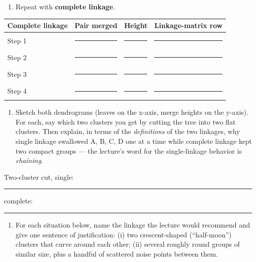 \documentclass[
  11pt,
]{article}
\newcounter{none} %
\providecommand{\tightlist}{%
  \setlength{\itemsep}{0pt}\setlength{\parskip}{0pt}}
\newcommand{\answerspace}[1]{\par\vspace*{#1}}  %
\newcommand{\blank}[1][1.2in]{\rule{#1}{0.4pt}}
\begin{document}
\answerspace{4in}

\begin{enumerate}
\def\labelenumi{(\alph{enumi})}
\setcounter{enumi}{1}
\tightlist
\item
  Repeat with \textbf{complete linkage}.
\end{enumerate}

{\def\LTcaptype{none} %
\begin{longtable}[]{@{}llll@{}}
\toprule\noalign{}
Complete linkage & Pair merged & Height & Linkage-matrix row \\
\midrule\noalign{}
\endhead
\bottomrule\noalign{}
\endlastfoot
Step 1 & \blank[1.2in] & \blank[0.7in] & \blank[2in] \\
Step 2 & \blank[1.2in] & \blank[0.7in] & \blank[2in] \\
Step 3 & \blank[1.2in] & \blank[0.7in] & \blank[2in] \\
Step 4 & \blank[1.2in] & \blank[0.7in] & \blank[2in] \\
\end{longtable}
}

\answerspace{3.2in}

\begin{enumerate}
\def\labelenumi{(\alph{enumi})}
\setcounter{enumi}{2}
\tightlist
\item
  Sketch both dendrograms (leaves on the x-axis, merge heights on the
  y-axis). For each, say which two clusters you get by cutting the tree
  into two flat clusters. Then explain, in terms of the
  \emph{definitions} of the two linkages, why single linkage swallowed
  A, B, C, D one at a time while complete linkage kept two compact
  groups --- the lecture's word for the single-linkage behavior is
  \emph{chaining}.
\end{enumerate}

\answerspace{3.4in}

Two-cluster cut, single: \blank[2in] \qquad complete: \blank[2in]

\answerspace{1.4in}

\begin{enumerate}
\def\labelenumi{(\alph{enumi})}
\setcounter{enumi}{3}
\tightlist
\item
  For each situation below, name the linkage the lecture would recommend
  and give one sentence of justification: (i) two crescent-shaped
  (``half-moon'') clusters that curve around each other; (ii) several
  roughly round groups of similar size, plus a handful of scattered
  noise points between them.
\end{enumerate}
\end{document}
